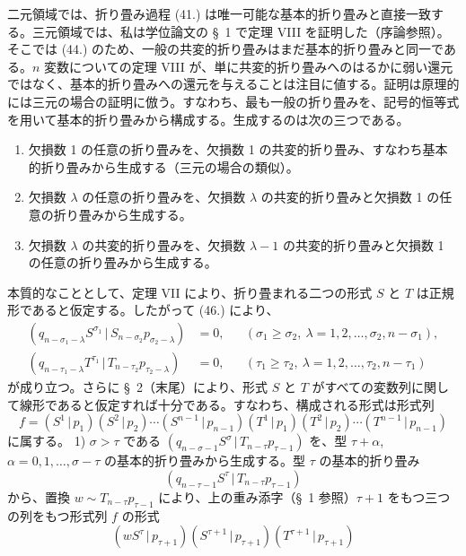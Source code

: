 \documentclass[11pt]{article}
\newcommand{\pair}[2]{(#1\,|\,#2)}
\begin{document}
二元領域では、折り畳み過程 (41.) は唯一可能な基本的折り畳みと直接一致する。三元領域では、私は学位論文の \S\ 1 で定理 VIII を証明した（序論参照）。そこでは (44.) のため、一般の共変的折り畳みはまだ基本的折り畳みと同一である。$n$ 変数についての定理 VIII が、単に共変的折り畳みへのはるかに弱い還元ではなく、基本的折り畳みへの還元を与えることは注目に値する。証明は原理的には三元の場合の証明に倣う。すなわち、最も一般の折り畳みを、記号的恒等式を用いて基本的折り畳みから構成する。生成するのは次の三つである。
\begin{enumerate}
\item 欠損数 1 の任意の折り畳みを、欠損数 1 の共変的折り畳み、すなわち基本的折り畳みから生成する（三元の場合の類似）。
\item 欠損数 $\lambda$ の任意の折り畳みを、欠損数 $\lambda$ の共変的折り畳みと欠損数 1 の任意の折り畳みから生成する。
\item 欠損数 $\lambda$ の共変的折り畳みを、欠損数 $\lambda-1$ の共変的折り畳みと欠損数 1 の任意の折り畳みから生成する。
\end{enumerate}
本質的なこととして、定理 VII により、折り畳まれる二つの形式 $S$ と $T$ は正規形であると仮定する。したがって (46.) により、
\begin{equation}
\begin{aligned}
\pair{q_{n-\sigma_1-\lambda}S^{\sigma_1}}{S_{n-\sigma_2}p_{\sigma_2-\lambda}}&=0,
&& (\sigma_1\ge\sigma_2,\ \lambda=1,2,\ldots,\sigma_2,n-\sigma_1),\\
\pair{q_{n-\tau_1-\lambda}T^{\tau_1}}{T_{n-\tau_2}p_{\tau_2-\lambda}}&=0,
&& (\tau_1\ge\tau_2,\ \lambda=1,2,\ldots,\tau_2,n-\tau_1)
\end{aligned}
\tag{62}
\end{equation}
が成り立つ。さらに \S\ 2（末尾）により、形式 $S$ と $T$ がすべての変数列に関して線形であると仮定すれば十分である。すなわち、構成される形式は形式列
\[
 f=\pair{S^1}{p_1}\pair{S^2}{p_2}\cdots\pair{S^{n-1}}{p_{n-1}}
   \pair{T^1}{p_1}\pair{T^2}{p_2}\cdots\pair{T^{n-1}}{p_{n-1}}
\]
に属する。
1) $\sigma>\tau$ である $\pair{q_{n-\sigma-1}S^\sigma}{T_{n-\tau}p_{\tau-1}}$ を、型 $\tau+\alpha$, $\alpha=0,1,\ldots,\sigma-\tau$ の基本的折り畳みから生成する。型 $\tau$ の基本的折り畳み
\[
 \pair{q_{n-\tau-1}S^\tau}{T_{n-\tau}p_{\tau-1}}
\]
から、置換 $w\sim T_{n-\tau}p_{\tau-1}$ により、上の重み添字（\S\ 1 参照）$\tau+1$ をもつ三つの列をもつ形式列 $f$ の形式
\begin{equation}
 \pair{wS^\tau}{p_{\tau+1}}\pair{S^{\tau+1}}{p_{\tau+1}}\pair{T^{\tau+1}}{p_{\tau+1}}
\tag{63}
\end{equation}
\end{document}
